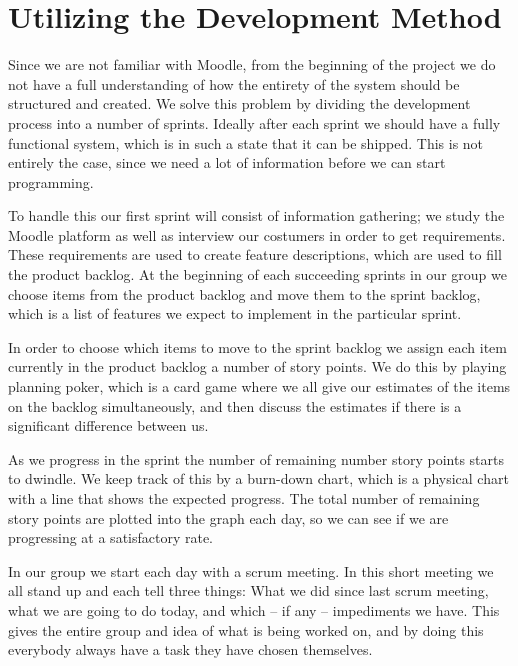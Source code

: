 \section{Utilizing the Development Method} %
Since we are not familiar with Moodle, from the beginning of the project we do not have a full understanding of how the entirety of the system should be structured and created.
We solve this problem by dividing the development process into a number of sprints.
Ideally after each sprint we should have a fully functional system, which is in such a state that it can be shipped.
This is not entirely the case, since we need a lot of information before we can start programming.

To handle this our first sprint will consist of information gathering; we study the Moodle platform as well as interview our costumers in order to get requirements.
These requirements are used to create feature descriptions, which are used to fill the product backlog.
At the beginning of each succeeding sprints in our group we choose items from the product backlog and move them to the sprint backlog, which is a list of features we expect to implement in the particular sprint.

In order to choose which items to move to the sprint backlog we assign each item currently in the product backlog a number of story points.
We do this by playing planning poker, which is a card game where we all give our estimates of the items on the backlog simultaneously, and then discuss the estimates if there is a significant difference between us.

As we progress in the sprint the number of remaining number story points starts to dwindle. 
We keep track of this by a burn-down chart, which is a physical chart with a line that shows the expected progress.
The total number of remaining story points are plotted into the graph each day, so we can see if we are progressing at a satisfactory rate.

In our group we start each day with a scrum meeting.
In this short meeting we all stand up and each tell three things: What we did since last scrum meeting, what we are going to do today, and which -- if any -- impediments we have.
This gives the entire group and idea of what is being worked on, and by doing this everybody always have a task they have chosen themselves.

